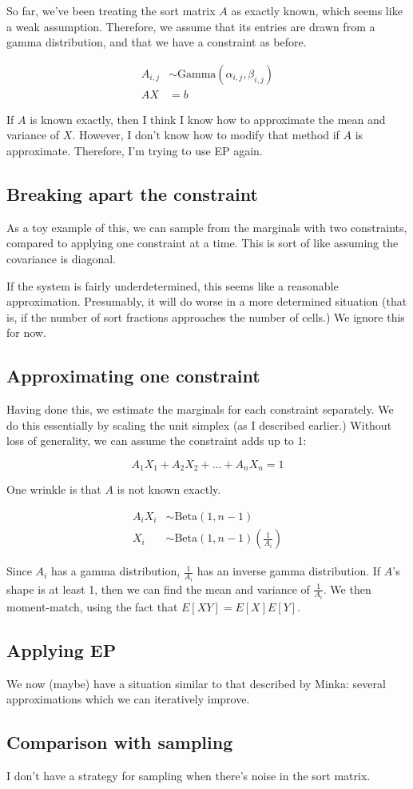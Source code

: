 \documentclass{article}\usepackage[]{graphicx}\usepackage[]{color}
\begin{document}
So far, we've been treating the sort matrix $A$ as exactly known,
which seems like a weak assumption. Therefore, we assume that
its entries are drawn from a gamma distribution, and that
we have a constraint as before.

\begin{align*}
A_{i,j} &\sim \mathrm{Gamma}(\alpha_{i,j},\beta_{i,j}) \\
AX &= b
\end{align*}

If $A$ is known exactly, then I think I know how to approximate
the mean and variance of $X$. However, I don't know how to
modify that method if $A$ is approximate. Therefore, I'm
trying to use EP again.

\subsection{Breaking apart the constraint}

As a toy example of this, we can sample from the
marginals with two constraints, compared to applying
one constraint at a time. This is sort of like assuming
the covariance is diagonal.





If the system is fairly underdetermined, this seems like a
reasonable approximation. Presumably, it will do worse
in a more determined situation (that is, if the number
of sort fractions approaches the number of cells.) We
ignore this for now.

\subsection{Approximating one constraint}

Having done this, we estimate the marginals for each
constraint separately. We do this essentially by
scaling the unit simplex (as I described earlier.)
Without loss of generality, we can assume the constraint
adds up to 1:

\[
A_1 X_1 + A_2 X_2 + ... + A_n X_n = 1
\]

One wrinkle is that $A$ is not known exactly.

\begin{align*}
A_i X_i &\sim \mathrm{Beta}(1, n-1) \\
X_i &\sim {\mathrm{Beta}(1, n-1)}(\frac{1}{A_i})
\end{align*}


Since $A_i$ has a gamma distribution, $\frac{1}{A_i}$ has
an inverse gamma distribution. If $A$'s shape is at least
1, then we can find the mean and variance of $\frac{1}{A_i}$.
We then moment-match, using the fact that $E[XY] = E[X]E[Y]$.


\subsection{Applying EP}

We now (maybe) have a situation similar to that
described by Minka: several approximations which we can
iteratively improve.





\subsection{Comparison with sampling}


I don't have a strategy for sampling when there's noise
in the sort matrix.
\end{document}
